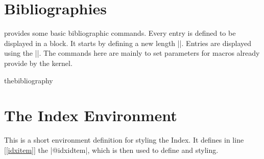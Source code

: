 \section*{Bibliographies}

\begin{multicols}{2}
\latex provides some basic bibliographic commands. Every entry is defined to be displayed in a block. It starts by defining a new length |\bibindent|. Entries are displayed using the  |\list|. The commands here are mainly to set parameters for macros already provide by the kernel.
\end{multicols}

\begin{docEnvironment}{thebibliography}{}
\end{docEnvironment}

\begin{teX}
\newdimen\bibindent
\setlength\bibindent{1.5em}
\newenvironment{thebibliography}[1]
     {\chapter*{\bibname}%
      \@mkboth{\MakeUppercase\bibname}{\MakeUppercase\bibname}%
      \list{\@biblabel{\@arabic\c@enumiv}}%
           {\settowidth\labelwidth{\@biblabel{#1}}%
            \leftmargin\labelwidth
            \advance\leftmargin\labelsep
            \@openbib@code
            \usecounter{enumiv}%
            \let\p@enumiv\@empty
            \renewcommand\theenumiv{\@arabic\c@enumiv}}%
      \sloppy
      \clubpenalty4000
      \@clubpenalty \clubpenalty
      \widowpenalty4000%
      \sfcode`\.\@m}
     {\def\@noitemerr
       {\@latex@warning{Empty `thebibliography' environment}}%
      \endlist}
\newcommand\newblock{\hskip .11em\@plus.33em\@minus.07em}
\let\@openbib@code\@empty
\end{teX}

\section*{The Index Environment}
This is a short environment definition for styling the Index. It defines in line [\ref{idxitem}] the 
|@idxidtem|, which is then used to define  and  styling.

